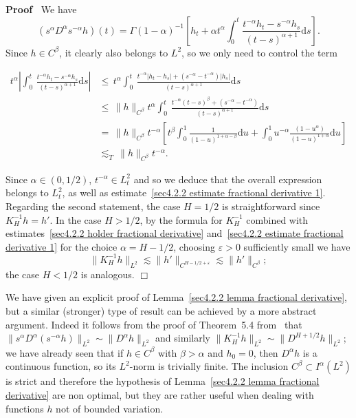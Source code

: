 \documentclass[10pt]{article}
\newcommand{\mathd}{\mathrm{d}}
\newenvironment{proof}{\noindent\textbf{Proof\ }}{\hspace*{\fill}$\Box$\medskip}
\begin{document}
\begin{proof}
  We have
  \[ (s^{\alpha} D^{\alpha} s^{- \alpha} h) (t) = \Gamma (1 - \alpha)^{- 1}
     \left[ h_t + \alpha t^{\alpha} \int_0^t \frac{t^{- \alpha} h_t - s^{-
     \alpha} h_s}{(t - s)^{\alpha + 1}} \mathd s \right] . \]
  Since $h \in C^{\beta}$, it clearly also belongs to $L^2$, so we only need
  to control the term
  
  \begin{align*}
    t^{\alpha} \left| \int_0^t \, \frac{t^{- \alpha} h_t - s^{- \alpha}
    h_s}{(t - s)^{\alpha + 1}} \mathd s \right| & \leqslant \, t^{\alpha}
    \int_0^t \, \frac{t^{- \alpha} | h_t - h_s | + (s^{- \alpha} - t^{-
    \alpha}) | h_s |}{(t - s)^{\alpha + 1}} \mathd s\\
    & \leqslant \, \| h \|_{C^{\beta}} t^{\alpha} \int_0^t \, \frac{t^{-
    \alpha} (t - s)^{\beta} + (s^{- \alpha} - t^{- \alpha})}{(t - s)^{\alpha +
    1}} \mathd s\\
    & = \, \| h \|_{C^{\beta}} t^{- \alpha} \left[ t^{\beta} \int_0^1
    \frac{1}{(1 - u)^{1 + \alpha - \beta}} \mathd u + \int_0^1 u^{- \alpha} 
    \frac{(1 - u^{\alpha})}{(1 - u)^{1 + \alpha}} \mathd u \right]\\
    & \lesssim_T \, \| h \|_{C^{\beta}} t^{- \alpha} .
  \end{align*}
  
  Since $\alpha \in (0, 1 / 2)$, $t^{- \alpha} \in L^2_t$ and so we deduce
  that the overall expression belongs to $L^2_t$, as well as
  estimate~{\eqref{sec4.2.2 estimate fractional derivative 1}}. Regarding the
  second statement, the case $H = 1 / 2$ is straightforward since $K^{- 1}_H h
  = h'$. In the case $H > 1 / 2$, by the formula for $K^{- 1}_H$ combined with
  estimates~{\eqref{sec4.2.2 holder fractional derivative}}
  and~{\eqref{sec4.2.2 estimate fractional derivative 1}} for the choice
  $\alpha = H - 1 / 2$, choosing $\varepsilon > 0$ sufficiently small we have
  \[ \| K^{- 1}_H h \|_{L^2} \lesssim \| h' \|_{C^{H - 1 / 2 + \varepsilon}}
     \lesssim \| h' \|_{C^{\beta}} ; \]
  the case $H < 1 / 2$ is analogous.
\end{proof}

\begin{remark}
  We have given an explicit proof of Lemma~\ref{sec4.2.2 lemma fractional
  derivative}, but a similar (stronger) type of result can be achieved by a
  more abstract argument. Indeed it follows from the proof of Theorem~5.4
  from~{\cite{picard}} that $\| s^{\alpha} D^{\alpha} (s^{- \alpha} h)
  \|_{L^2} \sim \| D^{\alpha} h \|_{L^2}$ and similarly $\| K^{- 1}_H h
  \|_{L^2} \sim \| D^{H + 1 / 2} h \|_{L^2}$; we have already seen that if $h
  \in C^{\beta}$ with $\beta > \alpha$ and $h_0 = 0$, then $D^{\alpha} h$ is a
  continuous function, so its $L^2$\mbox{-}norm is trivially finite. The
  inclusion $C^{\beta} \subset I^{\alpha} (L^2)$ is strict and therefore the
  hypothesis of Lemma~\ref{sec4.2.2 lemma fractional derivative} are non
  optimal, but they are rather useful when dealing with functions $h$ not of
  bounded variation.
\end{remark}
\end{document}
